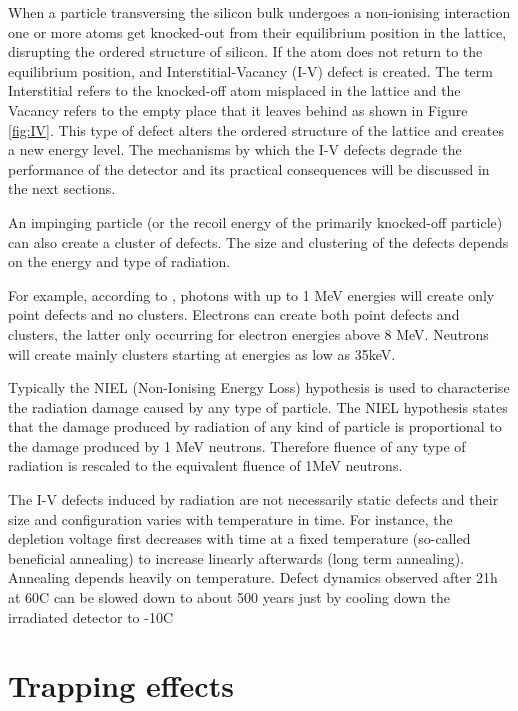 When a particle transversing the silicon bulk undergoes a non-ionising interaction one or more atoms get knocked-out from their equilibrium position in the lattice, disrupting the ordered structure of silicon. If the atom does not return to the equilibrium position, and Interstitial-Vacancy (I-V) defect is created. The term Interstitial refers to the knocked-off atom misplaced in the lattice and the Vacancy refers to the empty place that it leaves behind as shown in Figure \ref{fig:IV}. This type of defect alters the ordered structure of the lattice and creates a new energy level. The mechanisms by which the I-V defects degrade the performance of the detector and its practical consequences will be discussed in the next sections.

An impinging particle (or the recoil energy of the primarily knocked-off particle) can also create a cluster of defects. The size and clustering of the defects depends on the energy and type of radiation. 

For example, according to \cite{MMoll}, photons with up to 1 MeV energies will create only point defects and no clusters. Electrons can create both point defects and clusters, the latter only occurring for electron energies above 8 MeV. Neutrons will create mainly clusters starting at energies as low as 35keV. 

Typically the NIEL (Non-Ionising Energy Loss) hypothesis is used to characterise the radiation damage caused by any type of particle. The NIEL hypothesis states that the damage produced by radiation of any kind of particle is proportional to the damage produced by 1 MeV neutrons. Therefore fluence of any type of radiation is rescaled to the equivalent fluence of 1MeV neutrons. %

The I-V defects induced by radiation are not necessarily static defects and their size and configuration varies with temperature in time. For instance, the depletion voltage first decreases with time at a fixed temperature (so-called beneficial annealing) to increase linearly afterwards (long term annealing). Annealing depends heavily on temperature. Defect dynamics observed after 21h at 60C can be slowed down to about 500 years just by cooling down the irradiated detector to -10C \cite{MMollPHD}

\section{Trapping effects} %
\label{sec:trapEfect}

